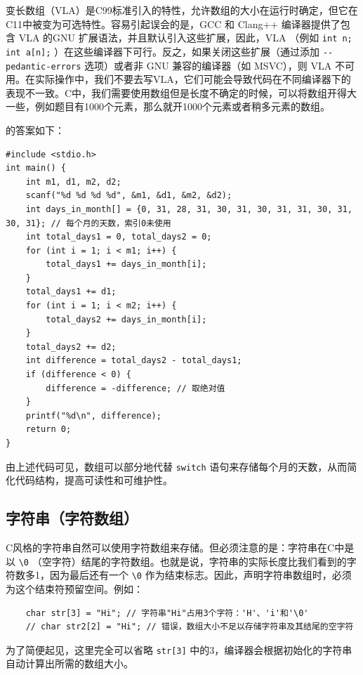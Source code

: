 \begin{remark}{}
    变长数组（VLA）是C99标准引入的特性，允许数组的大小在运行时确定，但它在C11中被变为可选特性。容易引起误会的是，GCC 和 Clang++ 编译器提供了包含 VLA 的GNU 扩展语法，并且默认引入这些扩展，因此，VLA （例如 \verb|int n; int a[n];| ）在这些编译器下可行。反之，如果关闭这些扩展（通过添加 \verb|--pedantic-errors| 选项）或者非 GNU 兼容的编译器（如 MSVC），则 VLA 不可用。在实际操作中，我们不要去写VLA，它们可能会导致代码在不同编译器下的表现不一致。C中，我们需要使用数组但是长度不确定的时候，可以将数组开得大一些，例如题目有1000个元素，那么就开1000个元素或者稍多元素的数组。
\end{remark}

\begin{example}{}{}
    的答案如下：
    \begin{verbatim}
#include <stdio.h>
int main() {
    int m1, d1, m2, d2;
    scanf("%d %d %d %d", &m1, &d1, &m2, &d2);
    int days_in_month[] = {0, 31, 28, 31, 30, 31, 30, 31, 31, 30, 31, 30, 31}; // 每个月的天数，索引0未使用
    int total_days1 = 0, total_days2 = 0;
    for (int i = 1; i < m1; i++) {
        total_days1 += days_in_month[i];
    }
    total_days1 += d1;
    for (int i = 1; i < m2; i++) {
        total_days2 += days_in_month[i];
    }
    total_days2 += d2;
    int difference = total_days2 - total_days1;
    if (difference < 0) {
        difference = -difference; // 取绝对值
    }
    printf("%d\n", difference);
    return 0;
}
    \end{verbatim}

    由上述代码可见，数组可以部分地代替 \verb|switch| 语句来存储每个月的天数，从而简化代码结构，提高可读性和可维护性。
\end{example}

\subsection{字符串（字符数组）}

C风格的字符串自然可以使用字符数组来存储。但必须注意的是：字符串在C中是以 \verb|\0| （空字符）结尾的字符数组。也就是说，字符串的实际长度比我们看到的字符数多1，因为最后还有一个 \verb|\0| 作为结束标志。因此，声明字符串数组时，必须为这个结束符预留空间。例如：
\begin{verbatim}
    char str[3] = "Hi"; // 字符串"Hi"占用3个字符：'H'、'i'和'\0'
    // char str2[2] = "Hi"; // 错误，数组大小不足以存储字符串及其结尾的空字符
\end{verbatim}
为了简便起见，这里完全可以省略 \verb|str[3]| 中的3，编译器会根据初始化的字符串自动计算出所需的数组大小。

